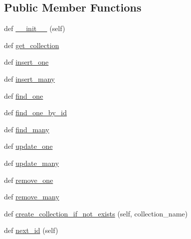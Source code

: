 \subsection*{Public Member Functions}
\begin{DoxyCompactItemize}
\item 
def \hyperlink{classNEAT__PyGenetics_1_1NEAT_1_1Tests_1_1MockClasses_1_1mock__DatabaseConnector_1_1mock__DatabaseConnector_a02398d61ab2bab01e548b901cd4d70f7}{\+\_\+\+\_\+init\+\_\+\+\_\+} (self)
\item 
def \hyperlink{classNEAT__PyGenetics_1_1NEAT_1_1Tests_1_1MockClasses_1_1mock__DatabaseConnector_1_1mock__DatabaseConnector_aef1a53517f1680bcc5ddfcbeff3f4785}{get\+\_\+collection}
\item 
def \hyperlink{classNEAT__PyGenetics_1_1NEAT_1_1Tests_1_1MockClasses_1_1mock__DatabaseConnector_1_1mock__DatabaseConnector_a9f8c8a2adf0987729548df63dfe118e8}{insert\+\_\+one}
\item 
def \hyperlink{classNEAT__PyGenetics_1_1NEAT_1_1Tests_1_1MockClasses_1_1mock__DatabaseConnector_1_1mock__DatabaseConnector_a0c7202b51bd1bf1001d3748ac39d825b}{insert\+\_\+many}
\item 
def \hyperlink{classNEAT__PyGenetics_1_1NEAT_1_1Tests_1_1MockClasses_1_1mock__DatabaseConnector_1_1mock__DatabaseConnector_ac03ab8b0c7fda497eac3ca7435aec3a0}{find\+\_\+one}
\item 
def \hyperlink{classNEAT__PyGenetics_1_1NEAT_1_1Tests_1_1MockClasses_1_1mock__DatabaseConnector_1_1mock__DatabaseConnector_ace6331811ba2e674ef037a66d073377a}{find\+\_\+one\+\_\+by\+\_\+id}
\item 
def \hyperlink{classNEAT__PyGenetics_1_1NEAT_1_1Tests_1_1MockClasses_1_1mock__DatabaseConnector_1_1mock__DatabaseConnector_a0ea2557b31cd7af3af9e098cc8dd3f7d}{find\+\_\+many}
\item 
def \hyperlink{classNEAT__PyGenetics_1_1NEAT_1_1Tests_1_1MockClasses_1_1mock__DatabaseConnector_1_1mock__DatabaseConnector_a01f612634b7f3da00fb1b327dfa5b524}{update\+\_\+one}
\item 
def \hyperlink{classNEAT__PyGenetics_1_1NEAT_1_1Tests_1_1MockClasses_1_1mock__DatabaseConnector_1_1mock__DatabaseConnector_a9fa32e7c0e425396238b66ab8f3ffb5e}{update\+\_\+many}
\item 
def \hyperlink{classNEAT__PyGenetics_1_1NEAT_1_1Tests_1_1MockClasses_1_1mock__DatabaseConnector_1_1mock__DatabaseConnector_a534ae334b83f54bce7d32f66faf22440}{remove\+\_\+one}
\item 
def \hyperlink{classNEAT__PyGenetics_1_1NEAT_1_1Tests_1_1MockClasses_1_1mock__DatabaseConnector_1_1mock__DatabaseConnector_ab3ff82b4de49e912a56c7b3cd0a208ac}{remove\+\_\+many}
\item 
def \hyperlink{classNEAT__PyGenetics_1_1NEAT_1_1Tests_1_1MockClasses_1_1mock__DatabaseConnector_1_1mock__DatabaseConnector_a9092111a34ce0573dace98120682e415}{create\+\_\+collection\+\_\+if\+\_\+not\+\_\+exists} (self, collection\+\_\+name)
\item 
def \hyperlink{classNEAT__PyGenetics_1_1NEAT_1_1Tests_1_1MockClasses_1_1mock__DatabaseConnector_1_1mock__DatabaseConnector_a7172e251a453e9481d7c8359b6961105}{next\+\_\+id} (self)
\end{DoxyCompactItemize}
